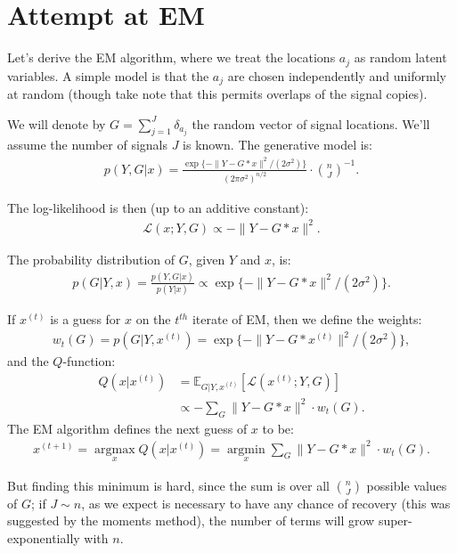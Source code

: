 \documentclass{article}
\theoremstyle{thm}
\theoremstyle{definition}
\newcommand{\LL}{\mathcal{L}}
\newcommand{\E}{\mathbb{E}}
\newcommand{\1}{\mathbf{1}}
\begin{document}
%


%
%
%


\section{Attempt at EM}

Let's derive the EM algorithm, where we treat the locations $a_j$ as random latent variables. A simple model is that the $a_j$ are chosen independently and uniformly at random (though take note that this permits overlaps of the signal copies).

We will denote by $G=\sum_{j=1}^J \delta_{a_j}$ the random vector of signal locations. We'll assume the number of signals $J$ is known. The generative model is:
%
\begin{align}
%
    p(Y , G | x)
    = \frac{\exp\{-\| Y - G \ast x \|^2 / (2\sigma^2)\}}{(2\pi\sigma^2)^{n/2}} 
        \cdot {n \choose J}^{-1}.
%
\end{align}

The log-likelihood is then (up to an additive constant):
%
\begin{align}
%
    \LL(x; Y, G) \propto - \|Y - G\ast x\|^2.
%
\end{align}

The probability distribution of $G$, given $Y$ and $x$, is:
%
\begin{align}
%
    p(G | Y, x) = \frac{ p(Y , G | x) }{ p(Y | x) }
    \propto \exp\{-\| Y - G \ast x \|^2 / (2\sigma^2)\}.
%
\end{align}

If $x^{(t)}$ is a guess for $x$ on the $t^{th}$ iterate of EM, then we define the weights:
%
\begin{align}
%
    w_t(G) = p(G | Y,x^{(t)}) = \exp\{-\| Y - G \ast x^{(t)} \|^2 / (2\sigma^2)\},
%
\end{align}
%
and the $Q$-function:
%
\begin{align}
%
    Q(x|x^{(t)}) 
    &= \E_{G|Y,x^{(t)}} \left[ \LL(x^{(t)};Y,G) \right]
        \nonumber \\
    &\propto - \sum_{G} \|Y - G\ast x\|^2 \cdot w_t(G).
%
\end{align}
%
The EM algorithm defines the next guess of $x$ to be:
%
\begin{align}
%
    x^{(t+1)} = \operatorname*{\arg\max}_x Q(x|x^{(t)})
        = \operatorname*{\arg\min}_x \sum_{G} \|Y - G\ast x\|^2 \cdot w_t(G).
%
\end{align}

But finding this minimum is hard, since the sum is over all ${n}\choose{J}$ possible values of $G$; if $J \sim n$, as we expect is necessary to have any chance of recovery (this was suggested by the moments method), the number of terms will grow super-exponentially with $n$.
\end{document}
